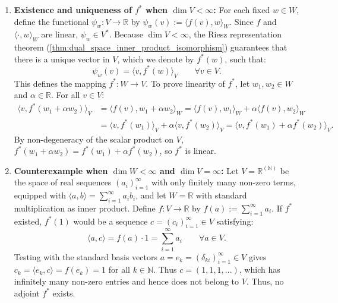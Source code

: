 \begin{exercisesolution}
\label{sol:adjoint_existence_finite_dim}
\begin{enumerate}[label=\textbf{(\alph*)}]
    \item \textbf{Existence and uniqueness of $f^*$ when $\dim V < \infty$:}
    For each fixed $w \in W$, define the functional $\psi_w \colon V \to \mathbb{R}$ by $\psi_w(v) := \langle f(v), w \rangle_W$.
    Since $f$ and $\langle \cdot, w \rangle_W$ are linear, $\psi_w \in V^*$.
    Because $\dim V < \infty$, the Riesz representation theorem (\cref{thm:dual_space_inner_product_isomorphism}) guarantees that there is a unique vector in $V$, which we denote by $f^*(w)$, such that:
    \[
    \psi_w(v) = \langle v, f^*(w) \rangle_V \qquad \forall v \in V.
    \]
    This defines the mapping $f^* \colon W \to V$.
    To prove linearity of $f^*$, let $w_1, w_2 \in W$ and $\alpha \in \mathbb{R}$. For all $v \in V$:
    \begin{align*}
    \langle v, f^*(w_1 + \alpha w_2) \rangle_V &= \langle f(v), w_1 + \alpha w_2 \rangle_W = \langle f(v), w_1 \rangle_W + \alpha \langle f(v), w_2 \rangle_W \\
    &= \langle v, f^*(w_1) \rangle_V + \alpha \langle v, f^*(w_2) \rangle_V = \langle v, f^*(w_1) + \alpha f^*(w_2) \rangle_V.
    \end{align*}
    By non-degeneracy of the scalar product on $V$, $f^*(w_1 + \alpha w_2) = f^*(w_1) + \alpha f^*(w_2)$, so $f^*$ is linear.

    \item \textbf{Counterexample when $\dim W < \infty$ and $\dim V = \infty$:}
    Let $V = \mathbb{R}^{(\mathbb{N})}$ be the space of real sequences $(a_i)_{i=1}^\infty$ with only finitely many non-zero terms, equipped with $\langle a, b \rangle = \sum_{i=1}^\infty a_i b_i$, and let $W = \mathbb{R}$ with standard multiplication as inner product.
    Define $f \colon V \to \mathbb{R}$ by $f(a) := \sum_{i=1}^\infty a_i$.
    If $f^*$ existed, $f^*(1)$ would be a sequence $c = (c_i)_{i=1}^\infty \in V$ satisfying:
    \[
    \langle a, c \rangle = f(a) \cdot 1 = \sum_{i=1}^\infty a_i \qquad \forall a \in V.
    \]
    Testing with the standard basis vectors $a = e_k = (\delta_{ki})_{i=1}^\infty \in V$ gives $c_k = \langle e_k, c \rangle = f(e_k) = 1$ for all $k \in \mathbb{N}$.
    Thus $c = (1, 1, 1, \dots)$, which has infinitely many non-zero entries and hence does not belong to $V$. Thus, no adjoint $f^*$ exists. \qedhere
\end{enumerate}
\end{exercisesolution}

